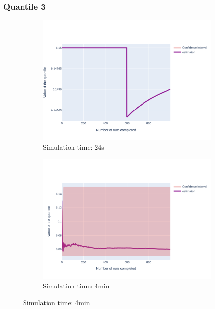 \documentclass{article}
\begin{document}
\subsubsection{Quantile 3}
\begin{figure}[H]
    \centering
    \begin{subfigure}{.495\textwidth}
        \centering
        \includegraphics[width=\textwidth]{../fig/quantile3/TFTP4_DAT_24s.png}
        \caption{Simulation time: 24s}
        \vspace{.5cm}
    \end{subfigure}
    \begin{subfigure}{.495\textwidth}
        \centering
        \includegraphics[width=\textwidth]{../fig/quantile3/TFTP4 DAT_4mn.png}
        \caption{Simulation time: 4min}
        \vspace{.5cm}

\end{subfigure}
\end{figure}
\end{document}
